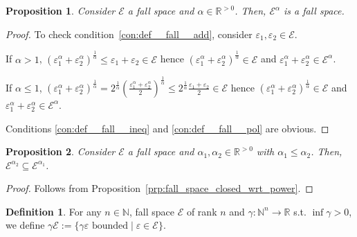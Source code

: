 \documentclass{article}
\numberwithin{equation}{section}
\theoremstyle{definition}
\newtheorem{definition}{Definition}[section]
\theoremstyle{plain}
\newtheorem{proposition}{Proposition}[section]
\newcommand{\Nats}{\mathbb{N}}
\newcommand{\Reals}{\mathbb{R}}
\newcommand{\Fall}{\mathcal{E}}
\begin{document}
\begin{proposition}

Consider $\Fall$ a fall space and $\alpha \in \Reals^{>0}$. Then, $\Fall^\alpha$ is a fall space.

\end{proposition}

\begin{proof}

To check condition~\ref{con:def__fall__add}, consider $\varepsilon_1, \varepsilon_2 \in \Fall$. 

If $\alpha > 1$, $(\varepsilon_1^\alpha + \varepsilon_2^\alpha)^\frac{1}{\alpha} \leq \varepsilon_1 + \varepsilon_2 \in \Fall$ hence $(\varepsilon_1^\alpha + \varepsilon_2^\alpha)^\frac{1}{\alpha} \in \Fall$ and $\varepsilon_1^\alpha + \varepsilon_2^\alpha \in \Fall^\alpha$.

If $\alpha \leq 1$, $(\varepsilon_1^\alpha + \varepsilon_2^\alpha)^\frac{1}{\alpha} = 2^\frac{1}{\alpha}(\frac{\varepsilon_1^\alpha + \varepsilon_2^\alpha}{2})^\frac{1}{\alpha} \leq 2^\frac{1}{\alpha} \frac{\varepsilon_1+\varepsilon_2}{2} \in \Fall$ hence $(\varepsilon_1^\alpha + \varepsilon_2^\alpha)^\frac{1}{\alpha} \in \Fall$ and $\varepsilon_1^\alpha + \varepsilon_2^\alpha \in \Fall^\alpha$.

Conditions \ref{con:def__fall__ineq} and \ref{con:def__fall__pol} are obvious.
\end{proof}

\begin{proposition}

Consider $\Fall$ a fall space and $\alpha_1,\alpha_2 \in \Reals^{>0}$ with $\alpha_1 \leq \alpha_2$. Then, ${\Fall^{\alpha_2} \subseteq \Fall^{\alpha_1}}$.

\end{proposition}

\begin{proof}

Follows from Proposition~\ref{prp:fall_space_closed_wrt_power}.
\end{proof}

\begin{samepage}
\begin{definition}

For any $n \in \Nats$, fall space $\Fall$ of rank $n$ and $\gamma: \Nats^n \rightarrow \Reals$ s.t. $\inf \gamma > 0$, we define $\gamma \Fall := \{\gamma \varepsilon \text{ bounded} \mid \varepsilon \in \Fall\}$.

\end{definition}
\end{samepage}
\end{document}
